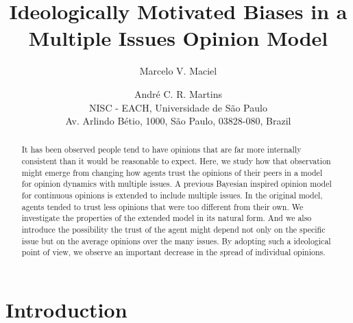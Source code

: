 \documentclass{article}
\begin{document}
\title{Ideologically Motivated Biases in a Multiple Issues Opinion Model}


\author{Marcelo V. Maciel \and Andr\'e C. R. Martins\\
  NISC - EACH, Universidade de S\~ao Paulo\\
  Av. Arlindo B\'etio, 1000, S\~ao Paulo, 03828-080, Brazil}



\date{}


\maketitle



\begin{abstract}
  It has been observed people tend to have opinions that are far more internally
  consistent than it would be reasonable to expect. Here, we study how that
  observation might emerge from changing how agents trust the opinions of their
  peers in a model for opinion dynamics with multiple issues. A previous
  Bayesian inspired opinion model for continuous opinions is extended to include
  multiple issues. In the original model, agents tended to trust less opinions
  that were too different from their own. We investigate the properties of the
  extended model in its natural form. And we also introduce the possibility the
  trust of the agent might depend not only on the specific issue but on the
  average opinions over the many issues. By adopting such a ideological point of
  view, we observe an important decrease in the spread of individual opinions.


\end{abstract}


\section{Introduction}

\end{document}
